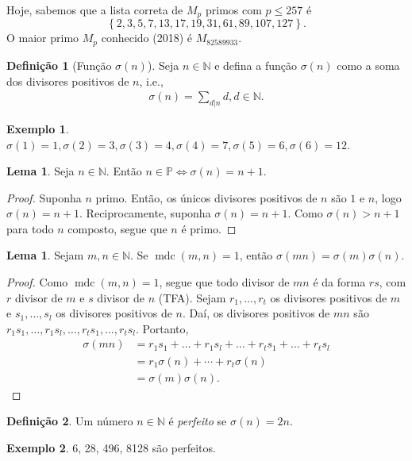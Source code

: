 \documentclass[a4paper,11pt,twoside, leqno]{article}
\DeclareMathOperator{\mdc}{mdc}
\theoremstyle{definition}
\newtheorem*{definition}{Definição}
\newtheorem{lemma}[theorem]{Lema}
\newtheorem*{example}{Exemplo}
\begin{document}
Hoje, sabemos que a lista correta de $M_p$ primos com $p\leq 257$ é $$\left\{ 2, 3, 5, 7, 13, 17, 19, 31, 61, 89, 107, 127 \right\}.$$ O maior primo $M_p$ conhecido (2018) é $M_{82589933}$.

\begin{definition}[Função $\sigma(n)$]
	Seja $n\in\mathbb{N}$ e defina a função $\sigma(n)$ como a soma dos divisores positivos de $n$, i.e., 
	\begin{align*}
	\sigma(n) = \sum_{d|n}d, d\in\mathbb{N}.
	\end{align*}
\end{definition}
\begin{example}
	$\sigma(1) = 1, \sigma(2) = 3, \sigma(3) = 4, \sigma(4) = 7, \sigma(5) = 6, \sigma(6) = 12$.
\end{example} 
\begin{lemma}
	\label{lema 26}
	Seja $n\in\mathbb{N}$. Então $n\in\mathbb{P}\Leftrightarrow\sigma(n) = n+1$.
\end{lemma}
\begin{proof}
	Suponha $n$ primo. Então, os únicos divisores positivos de $n$ são $1$ e $n$, logo $\sigma(n) = n+1$. Reciprocamente, suponha $\sigma(n) = n+1$. Como $\sigma(n) > n+1$ para todo $n$ composto, segue que $n$ é primo.
\end{proof}
\begin{lemma}
	\label{lema 27}
	Sejam $m,n\in\mathbb{N}$. Se $\mdc(m,n) = 1$, então $\sigma(mn) = \sigma(m)\sigma(n)$.
\end{lemma}
\begin{proof}
	Como $\mdc(m,n) = 1$, segue que todo divisor de $mn$ é da forma $rs$, com $r$ divisor de $m$ e $s$ divisor de $n$ (TFA). Sejam $r_1, \dots, r_t$ os divisores positivos de $m$ e $s_1, \dots, s_l$ os divisores positivos de $n$. Daí, os divisores positivos de $mn$ são $r_1s_1, \dots, r_1s_l, \dots, r_ts_1, \dots, r_ts_l$. Portanto,
	\begin{align*}
	\sigma(mn) &= r_1s_1 + \dots + r_1s_l + \dots + r_ts_1 + \dots + r_ts_l \\
	&= r_1\sigma(n) + \cdots + r_t\sigma(n) \\
	&= \sigma(m)\sigma(n).
	\end{align*}
\end{proof}
\begin{definition}
	Um número $n\in\mathbb{N}$ é {\em perfeito} se $\sigma(n)=2n$.
\end{definition}
\begin{example}
	6, 28, 496, 8128 são perfeitos.
\end{example}
\end{document}
